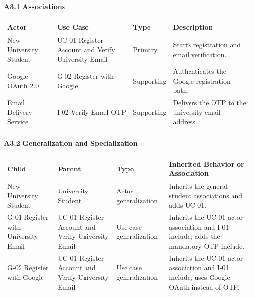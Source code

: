 \documentclass[12pt]{article}
\renewcommand{\baselinestretch}{1.5}
\begin{document}
\hypertarget{sec:a3-1-associations}{}
\paragraph*{A3.1 Associations}
\par\medskip

\begingroup
\small
\renewcommand{\baselinestretch}{1.0}\selectfont
\renewcommand{\arraystretch}{1.15}
\setlength{\tabcolsep}{6pt}
\begin{longtable}{|>{\raggedright\arraybackslash}p{}|>{\raggedright\arraybackslash}p{}|>{\raggedright\arraybackslash}p{}|>{\raggedright\arraybackslash}p{}|}
\hline
\textbf{Actor} & \textbf{Use Case} & \textbf{Type} & \textbf{Description} \\ \hline
\endhead
New University Student & UC-01 Register Account and Verify University Email & Primary & Starts registration and email verification. \\ \hline
Google OAuth 2.0 & G-02 Register with Google & Supporting & Authenticates the Google registration path. \\ \hline
Email Delivery Service & I-02 Verify Email OTP & Supporting & Delivers the OTP to the university email address. \\ \hline
\end{longtable}
\endgroup
\par\medskip

\hypertarget{sec:a3-2-generalization-and-specialization}{}
\paragraph*{A3.2 Generalization and Specialization}
\par\medskip

\begingroup
\small
\renewcommand{\baselinestretch}{1.0}\selectfont
\renewcommand{\arraystretch}{1.15}
\setlength{\tabcolsep}{6pt}
\begin{longtable}{|>{\raggedright\arraybackslash}p{}|>{\raggedright\arraybackslash}p{}|>{\raggedright\arraybackslash}p{}|>{\raggedright\arraybackslash}p{}|}
\hline
\textbf{Child} & \textbf{Parent} & \textbf{Type} & \textbf{Inherited Behavior or Association} \\ \hline
\endhead
New University Student & University Student & Actor generalization & Inherits the general student associations and adds UC-01. \\ \hline
G-01 Register with University Email & UC-01 Register Account and Verify University Email & Use case generalization & Inherits the UC-01 actor association and I-01 include; adds the mandatory OTP include. \\ \hline
G-02 Register with Google & UC-01 Register Account and Verify University Email & Use case generalization & Inherits the UC-01 actor association and I-01 include; uses Google OAuth instead of OTP. \\ \hline
\end{longtable}
\endgroup
\par\medskip
\end{document}
